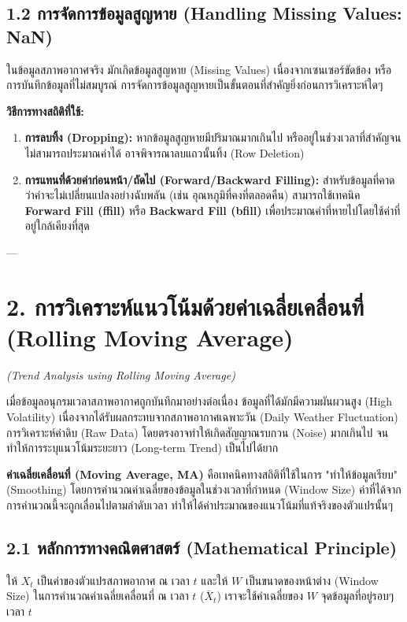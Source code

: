 \documentclass[11pt,a4paper,openany]{report}
\begin{document}
\subsection{1.2 การจัดการข้อมูลสูญหาย (Handling Missing Values: NaN)}

ในข้อมูลสภาพอากาศจริง มักเกิดข้อมูลสูญหาย (Missing Values) เนื่องจากเซนเซอร์ขัดข้อง หรือการบันทึกข้อมูลที่ไม่สมบูรณ์ การจัดการข้อมูลสูญหายเป็นขั้นตอนที่สำคัญยิ่งก่อนการวิเคราะห์ใดๆ

\textbf{วิธีการทางสถิติที่ใช้:}
\begin{enumerate}
  \item \textbf{การลบทิ้ง (Dropping):} หากข้อมูลสูญหายมีปริมาณมากเกินไป หรืออยู่ในช่วงเวลาที่สำคัญจนไม่สามารถประมาณค่าได้ อาจพิจารณาลบแถวนั้นทิ้ง (Row Deletion)
  \item \textbf{การแทนที่ด้วยค่าก่อนหน้า/ถัดไป (Forward/Backward Filling):} สำหรับข้อมูลที่คาดว่าค่าจะไม่เปลี่ยนแปลงอย่างฉับพลัน (เช่น อุณหภูมิที่คงที่ตลอดคืน) สามารถใช้เทคนิค \textbf{Forward Fill (ffill)} หรือ \textbf{Backward Fill (bfill)} เพื่อประมาณค่าที่หายไปโดยใช้ค่าที่อยู่ใกล้เคียงที่สุด
\end{enumerate}


---

\section{2. การวิเคราะห์แนวโน้มด้วยค่าเฉลี่ยเคลื่อนที่ (Rolling Moving Average)}

\textit{(Trend Analysis using Rolling Moving Average)}

เมื่อข้อมูลอนุกรมเวลาสภาพอากาศถูกบันทึกมาอย่างต่อเนื่อง ข้อมูลที่ได้มักมีความผันผวนสูง (High Volatility) เนื่องจากได้รับผลกระทบจากสภาพอากาศเฉพาะวัน (Daily Weather Fluctuation) การวิเคราะห์ค่าดิบ (Raw Data) โดยตรงอาจทำให้เกิดสัญญาณรบกวน (Noise) มากเกินไป จนทำให้การระบุแนวโน้มระยะยาว (Long-term Trend) เป็นไปได้ยาก

\textbf{ค่าเฉลี่ยเคลื่อนที่ (Moving Average, MA)} คือเทคนิคทางสถิติที่ใช้ในการ "ทำให้ข้อมูลเรียบ" (Smoothing) โดยการคำนวณค่าเฉลี่ยของข้อมูลในช่วงเวลาที่กำหนด (Window Size) ค่าที่ได้จากการคำนวณนี้จะถูกเลื่อนไปตามลำดับเวลา ทำให้ได้ค่าประมาณของแนวโน้มที่แท้จริงของตัวแปรนั้นๆ

\subsection{2.1 หลักการทางคณิตศาสตร์ (Mathematical Principle)}

ให้ $X_t$ เป็นค่าของตัวแปรสภาพอากาศ ณ เวลา $t$ และให้ $W$ เป็นขนาดของหน้าต่าง (Window Size) ในการคำนวณค่าเฉลี่ยเคลื่อนที่ ณ เวลา $t$ ($\bar{X}_t$) เราจะใช้ค่าเฉลี่ยของ $W$ จุดข้อมูลที่อยู่รอบๆ เวลา $t$
\end{document}

